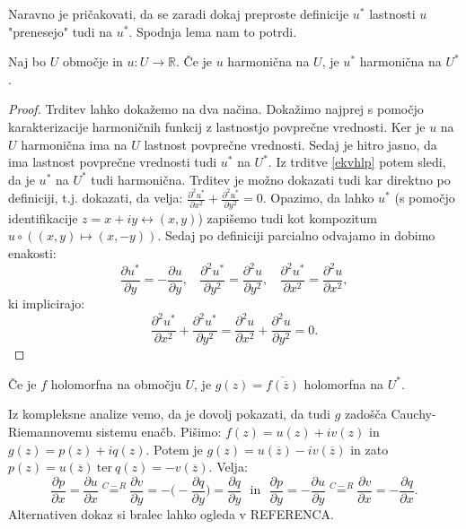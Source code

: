\documentclass[mat1]{fmfdelo}
\begin{document}
    Naravno je pričakovati, da se zaradi dokaj preproste definicije $u^*$ lastnosti $u$ "prenesejo" tudi na $u^*$. 
    Spodnja lema nam to potrdi.

    \begin{lema}
        \label{lemaharm}
        Naj bo $U$ območje in $u: U \to \mathbb{R}$. Če je $u$ harmonična na $U$, je $u^*$ harmonična na $U^*$. 
    \end{lema}
    \begin{proof}
        Trditev lahko dokažemo na dva načina. Dokažimo najprej s pomočjo karakterizacije harmoničnih funkcij z lastnostjo povprečne vrednosti. 
        Ker je $u$ na $U$ harmonična ima na $U$ lastnost povprečne vrednosti.
        Sedaj je hitro jasno, da ima lastnost povprečne vrednosti tudi $u^*$ na $U^*$. 
        Iz trditve \ref{ekvhlp} potem sledi, da je $u^*$ na $U^*$ tudi harmonična.
        \newline
        Trditev je možno dokazati tudi kar direktno po definiciji, t.j. dokazati, da velja: $\frac{\partial^2 u^*}{\partial x^2} + \frac{\partial^2 u^*}{\partial y^2} = 0$. 
        Opazimo, da lahko $u^*$ (s pomočjo identifikacije $z = x + iy \leftrightarrow (x,y)$) zapišemo tudi kot kompozitum $u \circ ((x,y) \mapsto (x, -y))$. 
        Sedaj po definiciji parcialno odvajamo in dobimo enakosti:
        $$
            \frac{\partial u^*}{\partial y} = - \frac{\partial u }{\partial y},~~~~\frac{\partial^2 u^*}{\partial y^2} = \frac{\partial^2 u }{\partial y^2},~~~~\frac{\partial^2 u^*}{\partial x^2} = \frac{\partial^2 u }{\partial x^2},
        $$
        ki implicirajo:
        $$
            \frac{\partial^2 u^*}{\partial x^2} + \frac{\partial^2 u^*}{\partial y^2} = \frac{\partial^2 u}{\partial x^2} + \frac{\partial^2 u}{\partial y^2} = 0.
        $$
    \end{proof}
    \begin{lema}
        Če je $f$ holomorfna na območju $U$, je $g(z) = \overline{f({\overline{z}})}$ holomorfna na $U^*$.
    \end{lema}
    \begin{dokaz}
        Iz kompleksne analize vemo, da je dovolj pokazati, da tudi $g$ zadošča Cauchy-Riemannovemu sistemu enačb.
        \newline
        Pišimo: $f(z) = u(z) + iv(z)$ in $g(z) = p(z) + iq(z)$.
        Potem je $g(z) = u(\overline{z}) - iv(\overline{z})$ in zato $p(z) = u(\overline{z})~\text{ter}~q(z) = -v(\overline{z})$. 
        \newline
        Velja:
        \begin{equation*}
            \frac{\partial p}{\partial x} = \frac{\partial u}{\partial x} \overset{C-R}{=} \frac{\partial v}{\partial y} = - \bigg(- \frac{\partial q}{\partial y}\bigg) = \frac{\partial q}{\partial y}~~~\text{in}~~~
            \frac{\partial p}{\partial y} = -\frac{\partial u}{\partial y} \overset{C-R}{=} \frac{\partial v}{\partial x} = -\frac{\partial q}{\partial x}.
        \end{equation*}
        Alternativen dokaz si bralec lahko ogleda v REFERENCA.
    \end{dokaz}
\end{document}
